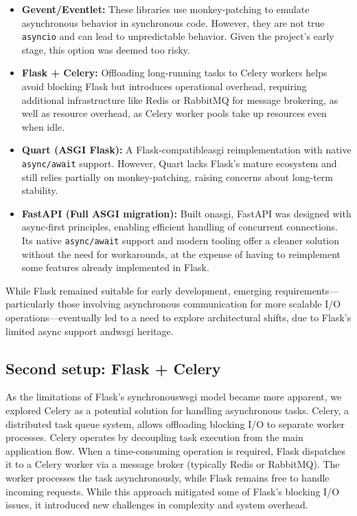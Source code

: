         \begin{itemize}
            \item \textbf{Gevent/Eventlet:} These libraries use monkey-patching to emulate asynchronous behavior in synchronous code. However, 
            they are not true \texttt{asyncio} and can lead to unpredictable behavior. Given the project's early stage, this option was deemed too risky.

            \item \textbf{Flask + Celery:} Offloading long-running tasks to Celery workers helps avoid blocking Flask but introduces operational overhead, 
            requiring additional infrastructure like Redis or RabbitMQ for message brokering, as well as resource overhead, as Celery worker pools take 
            up resources even when idle.

            \item \textbf{Quart (ASGI Flask):} A Flask-compatible\ac{asgi} reimplementation with native \texttt{async/await} support. However, Quart lacks 
            Flask's mature ecosystem and still relies partially on monkey-patching, raising concerns about long-term stability.

            \item \textbf{FastAPI (Full ASGI migration):} Built on\ac{asgi}, FastAPI was designed with async-first principles, enabling efficient handling 
            of concurrent connections. Its native \texttt{async/await} support and modern tooling offer a cleaner solution without the need 
            for workarounds, at the expense of having to reimplement some features already implemented in Flask.
        \end{itemize}

        While Flask remained suitable for early development, emerging requirements—particularly those involving asynchronous 
        communication for more scalable I/O operations—eventually led to a need to explore architectural shifts, due to 
        Flask's limited async support and\ac{wsgi} heritage. 
    
    \subsection{Second setup: Flask + Celery}

        As the limitations of Flask's synchronous\ac{wsgi} model became more apparent, we explored Celery as a potential solution for handling 
        asynchronous tasks. Celery, a distributed task queue system, allows offloading blocking I/O to separate worker processes. 
        Celery operates by decoupling task execution from the main application flow. When a time-consuming operation is required, Flask 
        dispatches it to a Celery worker via a message broker (typically Redis or RabbitMQ). The worker processes the task asynchronously, 
        while Flask remains free to handle incoming requests. While this approach mitigated some of Flask's blocking I/O issues, it 
        introduced new challenges in complexity and system overhead.

